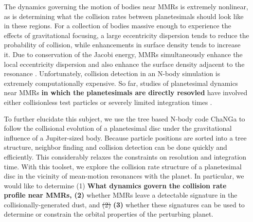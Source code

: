 \documentclass[fleqn,usenatbib]{mnras}
\begin{document}
The dynamics governing the motion of bodies near MMRs is extremely nonlinear, as is determining what the collision rates between planetesimals 
should look like in these regions. For a collection of bodies massive enough to experience the effects of gravitational focusing, a large eccentricity 
dispersion tends to reduce the probability of collision, while enhancements in surface density tends to increase it. Due to conservation of the Jacobi 
energy, MMRs simultaneously enhance the local eccentricity dispersion and also enhance the surface density adjacent to the resonance 
\citep{2000Icar..143...45R, 2017ApJ...850..103B}. Unfortunately, collision detection in an N-body simulation is extremely computationally expensive. 
So far, studies of planetesimal dynamics near MMRs \textbf{in which the planetesimals are directly resovled} have involved either collisionless test particles 
\citep{2017ApJ...850..103B, 2016ApJ...818..159T, 2018ApJ...857....3T} or severely limited integration times \citep{2000Icar..143...45R}.

To further elucidate this subject, we use the tree based N-body code {\sc ChaNGa}\citep{2008IEEEpds...ChaNGa, 2015AphCom..2..1}  to follow the 
collisional evolution of a planetesimal disc under the gravitational influence of a Jupiter-sized body. Because particle positions are sorted into a tree 
structure, neighbor finding and collision detection can be done quickly and efficiently. This considerably relaxes the constraints on resolution and 
integration time. With this toolset, we explore the collision rate structure of a planetesimal disc in the vicinity of mean-motion resonances with the planet. In 
particular, we would like to determine (1) \textbf{What dynamics govern the collision rate profile near MMRs, (2)} whether MMRs leave a detectable signature in the collisionally-generated dust, and \sout{(2)} \textbf{(3)} whether these 
signatures can be used to determine or constrain the orbital properties of the perturbing planet.
\end{document}

